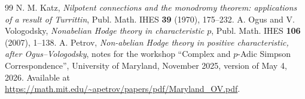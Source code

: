 \documentclass[10pt,a4paper]{amsart}
\begin{document}
\begin{thebibliography}{99}
 N. M. Katz, \emph{Nilpotent connections and the monodromy theorem: applications of a result of Turrittin}, Publ. Math. IHES \textbf{39} (1970), 175--232.
 A. Ogus and V. Vologodsky, \emph{Nonabelian Hodge theory in characteristic \(p\)}, Publ. Math. IHES \textbf{106} (2007), 1--138.
 A. Petrov, \emph{Non-abelian Hodge theory in positive characteristic, after Ogus--Vologodsky}, notes for the workshop ``Complex and \(p\)-Adic Simpson Correspondence'', University of Maryland, November 2025, version of May 4, 2026. Available at \url{https://math.mit.edu/~apetrov/papers/pdf/Maryland_OV.pdf}.
\end{thebibliography}
\end{document}
